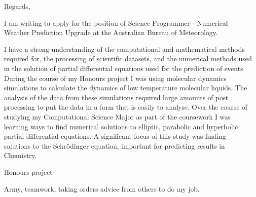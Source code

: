 
\closing{Regards,}



\makelettertitle

I am writing to apply for the position of Science Programmer - Numerical Weather Prediction Upgrade at the Australian Bureau of Meteorology.


I have a strong understanding of the computational and mathematical methods required for, the processing of scientific datasets, and the numerical methods used in the solution of partial differential equations used for the prediction of events. During the course of my Honours project I was using molecular dynamics simulations to calculate the dynamics of low temperature molecular liquids. The analysis of the data from these simulations required large amounts of post processing to put the data in a form that is easily to analyse. Over the course of studying my Computational Science Major as part of the coursework I was learning ways to find numerical solutions to elliptic, parabolic and hyperbolic partial differential equations. A significant focus of this study was finding solutions to the Schr\"odinger equation, important for predicting results in Chemistry.





Honours project





Army, teamwork, taking orders advice from others to do my job.


\makeletterclosing



